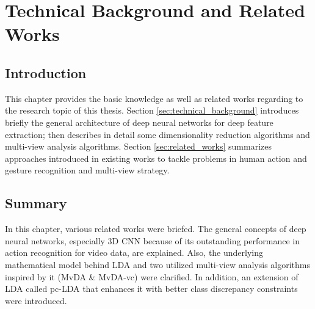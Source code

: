 
\chapter{Technical Background and Related Works} \label{chap:background}
    \section{Introduction}
        This chapter provides the basic knowledge as well as related works regarding to the research topic of this thesis.
        Section \ref{sec:technical_background} introduces briefly the general architecture of deep neural networks for deep feature extraction; then describes in detail some dimensionality reduction algorithms and multi-view analysis algorithms.
        Section \ref{sec:related_works} summarizes approaches introduced in existing works to tackle problems in human action and gesture recognition and multi-view strategy.

    
    

    \section{Summary}
        In this chapter, various related works were briefed.
        The general concepts of deep neural networks, especially 3D CNN because of its outstanding performance in action recognition for video data, are explained.
        Also, the underlying mathematical model behind LDA and two utilized multi-view analysis algorithms inspired by it (MvDA \& MvDA-vc) were clarified.
        In addition, an extension of LDA called pc-LDA that enhances it with better class discrepancy constraints were introduced.

